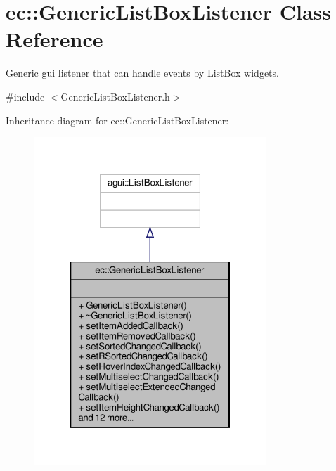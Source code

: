 \hypertarget{classec_1_1_generic_list_box_listener}{}\section{ec\+:\+:Generic\+List\+Box\+Listener Class Reference}
\label{classec_1_1_generic_list_box_listener}


Generic gui listener that can handle events by List\+Box widgets.  




{\ttfamily \#include $<$Generic\+List\+Box\+Listener.\+h$>$}



Inheritance diagram for ec\+:\+:Generic\+List\+Box\+Listener\+:\nopagebreak
\begin{figure}[H]
\begin{center}
\leavevmode
\includegraphics[width=248pt]{classec_1_1_generic_list_box_listener__inherit__graph}
\end{center}
\end{figure}


